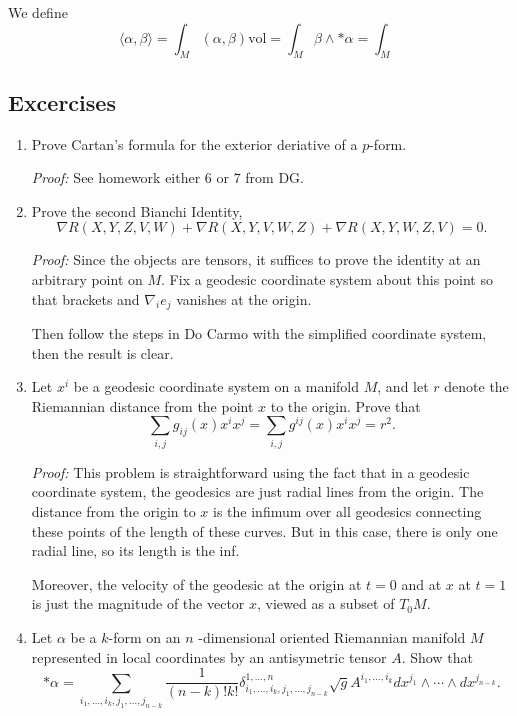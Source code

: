 \documentclass[12pt, reqno]{extarticle}
\theoremstyle{plain}
\theoremstyle{definition}
\theoremstyle{remark}
\begin{document}
We define
\[
    \langle \alpha, \beta\rangle = \int_M (\alpha,\beta)\text{vol} = 
    \int_M \beta \wedge *\alpha = \int_M 
\]

\subsection{Excercises}

\begin{enumerate}
    \item[1.28] Prove Cartan's formula for the exterior deriative of a $p$-form.
    
    \textit{Proof:} See homework either 6 or 7 from DG.

    \item[1.29] Prove the second Bianchi Identity,
    \[
        \nabla R(X,Y,Z,V,W) + \nabla R(X,Y,V,W,Z) + \nabla R(X,Y,W,Z,V) = 0.
    \]

    \textit{Proof:} Since the objects are tensors, it suffices to prove 
    the identity at an arbitrary point on $M$. Fix a geodesic coordinate
    system about this point so that brackets and $\nabla_i e_j$ vanishes 
    at the origin. 

    Then follow the steps in Do Carmo with the simplified coordinate system,
    then the result is clear.

    \item[1.30] Let $x^i$ be a geodesic coordinate system on a manifold $M$, and
    let $r$ denote the Riemannian distance from the point $x$ to the origin. Prove
    that 
    \[
        \sum_{i,j} g_{ij}(x)x^i x^j = \sum_{i,j} g^{ij}(x)x^i x^j = r^2.
    \]

    \textit{Proof:} This problem is straightforward using the 
    fact that in a geodesic coordinate system, the geodesics are just radial
    lines from the origin. The distance from the origin to $x$ is the infimum over
    all geodesics connecting these points of the length of these curves. But 
    in this case, there is only one radial line, so its length is the inf. 

    Moreover, the velocity of the geodesic at the origin at $t = 0$ and at $x$ at $t = 1$ 
    is just the magnitude of the vector $x$, viewed as a subset of $T_0 M$. 

    \item[1.31] Let $\alpha$ be a $k$-form on an $n$ -dimensional oriented Riemannian 
    manifold $M$ represented in local coordinates by an antisymetric tensor $A$. 
    Show that 
    \[
        *\alpha = \sum_{i_1, \dots, i_k, j_1, \dots, j_{n-k}} 
        \frac{1}{(n-k)!k!}\delta^{1, \dots, n}_{i_1, \dots, i_k, j_1, \dots, j_{n-k}}
        \sqrt{g} A^{i_1, \dots, i_k}dx^{j_1} \wedge \cdots \wedge dx^{j_{n-k}}.
    \]


\end{enumerate}
\end{document}

